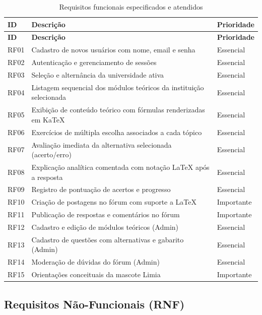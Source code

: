 \documentclass[12pt, a4paper]{article}
\begin{document}
\begin{longtable}{l p{10cm} l}
\caption{Requisitos funcionais especificados e atendidos} \\
\toprule
\textbf{ID} & \textbf{Descri\c{c}\~{a}o} & \textbf{Prioridade} \\
\midrule
\endfirsthead
\toprule
\textbf{ID} & \textbf{Descri\c{c}\~{a}o} & \textbf{Prioridade} \\
\midrule
\endhead
RF01 & Cadastro de novos usu\'{a}rios com nome, email e senha & Essencial \\
RF02 & Autentica\c{c}\~{a}o e gerenciamento de sess\~{o}es & Essencial \\
RF03 & Sele\c{c}\~{a}o e altern\^{a}ncia da universidade ativa & Essencial \\
RF04 & Listagem sequencial dos m\'{o}dulos te\'{o}ricos da institui\c{c}\~{a}o selecionada & Essencial \\
RF05 & Exibi\c{c}\~{a}o de conte\'{u}do te\'{o}rico com f\'{o}rmulas renderizadas em KaTeX & Essencial \\
RF06 & Exerc\'{i}cios de m\'{u}ltipla escolha associados a cada t\'{o}pico & Essencial \\
RF07 & Avalia\c{c}\~{a}o imediata da alternativa selecionada (acerto/erro) & Essencial \\
RF08 & Explica\c{c}\~{a}o anal\'{i}tica comentada com nota\c{c}\~{a}o \LaTeX{} ap\'{o}s a resposta & Essencial \\
RF09 & Registro de pontua\c{c}\~{a}o de acertos e progresso & Essencial \\
RF10 & Cria\c{c}\~{a}o de postagens no f\'{o}rum com suporte a \LaTeX{} & Importante \\
RF11 & Publica\c{c}\~{a}o de respostas e coment\'{a}rios no f\'{o}rum & Importante \\
RF12 & Cadastro e edi\c{c}\~{a}o de m\'{o}dulos te\'{o}ricos (Admin) & Essencial \\
RF13 & Cadastro de quest\~{o}es com alternativas e gabarito (Admin) & Essencial \\
RF14 & Modera\c{c}\~{a}o de d\'{u}vidas do f\'{o}rum (Admin) & Essencial \\
RF15 & Orienta\c{c}\~{o}es conceituais da mascote Limia & Importante \\
\bottomrule
\end{longtable}

\subsection{Requisitos N\~{a}o-Funcionais (RNF)}
\end{document}

